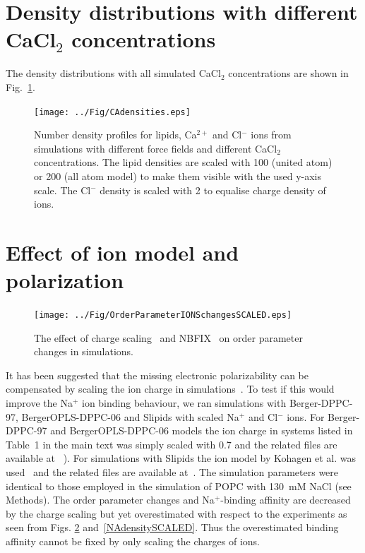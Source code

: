 \documentclass[twoside,twocolumn,9pt]{article}
\begin{document}
\section{Density distributions with different CaCl$_2$ concentrations}

The density distributions with all simulated CaCl$_2$ concentrations are shown in Fig.~\ref{CAdensities}.
\begin{figure}[t]
  \centering
  \texttt{[image: ../Fig/CAdensities.eps]}
  \caption{\label{CAdensities}
    Number density profiles for lipids, Ca$^{2+}$ and Cl$^-$ ions from simulations with different force fields 
    and different CaCl$_2$ concentrations. 
    The lipid densities are scaled with 100 (united atom) or 200 (all atom model) to make them visible with the used y-axis scale.
    The Cl$^-$ density is scaled with 2 to equalise charge density of ions.
  }
\end{figure}

\section{Effect of ion model and polarization}

\begin{figure}[t]
  \centering
  \texttt{[image: ../Fig/OrderParameterIONSchangesSCALED.eps]} 
  \caption{\label{OPchangesSCALED}
    The effect of charge scaling~\cite{leontyev11,kohagen14} and NBFIX~\cite{venable13} on order parameter changes in simulations. 
    }
\end{figure}

It has been suggested that the missing electronic polarizability 
can be compensated by scaling the ion charge in simulations~\cite{leontyev11}. 
To test if this would improve the Na$^+$ ion binding behaviour, we ran simulations with Berger-DPPC-97, BergerOPLS-DPPC-06
and Slipids with scaled Na$^+$ and Cl$^-$ ions. For Berger-DPPC-97 and BergerOPLS-DPPC-06 models 
the ion charge in systems listed in Table~1 in the main text was simply scaled with 0.7 and
the related files are available 
at ~\cite{DPPCBergerNaCl150mMscaled,DPPCBergerNaCl1000mMscaled,DPPCBergerOPLS06NaCl150mMscaled,DPPCBergerOPLS06NaCl1000mMscaled}). 
For simulations with Slipids the ion model by Kohagen et al. was used~\cite{kohagen16} and the related files are 
available at~\cite{slipidsFILESpopcSCALED}. The simulation parameters were identical to those employed in the simulation of POPC with 130~mM NaCl (see Methods).
The order parameter changes and Na$^+$-binding affinity are decreased by the charge scaling but 
yet overestimated with respect to the experiments as seen from Figs. \ref{OPchangesSCALED} and~\ref{NAdensitySCALED}. 
Thus the overestimated binding affinity cannot be fixed by only scaling the charges of ions.
\end{document}

